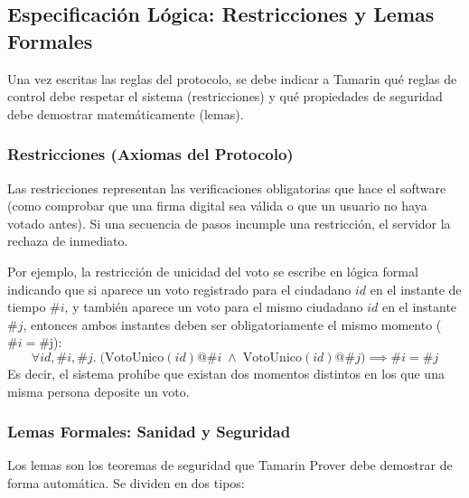 \subsection{Especificación Lógica: Restricciones y Lemas Formales}

Una vez escritas las reglas del protocolo, se debe indicar a Tamarin qué reglas de control debe respetar el sistema (restricciones) y qué propiedades de seguridad debe demostrar matemáticamente (lemas).

\subsubsection{Restricciones (Axiomas del Protocolo)}

Las restricciones representan las verificaciones obligatorias que hace el software (como comprobar que una firma digital sea válida o que un usuario no haya votado antes). Si una secuencia de pasos incumple una restricción, el servidor la rechaza de inmediato.

Por ejemplo, la restricción de unicidad del voto se escribe en lógica formal indicando que si aparece un voto registrado para el ciudadano $id$ en el instante de tiempo $\#i$, y también aparece un voto para el mismo ciudadano $id$ en el instante $\#j$, entonces ambos instantes deben ser obligatoriamente el mismo momento ($\#i = $\#j):
\begin{equation}
	\forall id, \#i, \#j. \; \big(\text{VotoUnico}(id) @ \#i \;\land\; \text{VotoUnico}(id) @ \#j\big) \implies \#i = \#j
\end{equation}
Es decir, el sistema prohíbe que existan dos momentos distintos en los que una misma persona deposite un voto.

\subsubsection{Lemas Formales: Sanidad y Seguridad}

Los lemas son los teoremas de seguridad que Tamarin Prover debe demostrar de forma automática. Se dividen en dos tipos:

